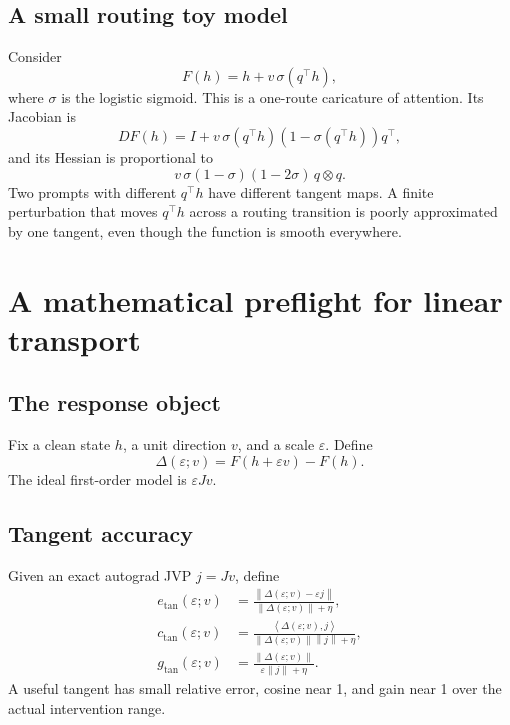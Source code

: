 \documentclass[11pt]{article}
\newcommand{\Norm}[1]{\left\lVert #1 \right\rVert}
\newcommand{\ip}[2]{\left\langle #1,#2 \right\rangle}
\newcommand{\eps}{\varepsilon}
\theoremstyle{definition}
\theoremstyle{remark}
\begin{document}
\subsection{A small routing toy model}
Consider
\begin{equation}
  F(h)=h+v\,\sigma(q^\top h),
  \label{eq:routing_toy}
\end{equation}
where $\sigma$ is the logistic sigmoid. This is a one-route caricature of attention. Its Jacobian is
\begin{equation}
  DF(h)=I+v\,\sigma(q^\top h)(1-\sigma(q^\top h))q^\top,
\end{equation}
and its Hessian is proportional to
\begin{equation}
  v\,\sigma(1-\sigma)(1-2\sigma)\,q\otimes q.
\end{equation}
Two prompts with different $q^\top h$ have different tangent maps. A finite perturbation that moves $q^\top h$ across a routing transition is poorly approximated by one tangent, even though the function is smooth everywhere.

\section{A mathematical preflight for linear transport}

\subsection{The response object}
Fix a clean state $h$, a unit direction $v$, and a scale $\eps$. Define
\begin{equation}
  \Delta(\eps;v)=F(h+\eps v)-F(h).
\end{equation}
The ideal first-order model is $\eps Jv$.

\subsection{Tangent accuracy}
Given an exact autograd JVP $j=Jv$, define
\begin{align}
  e_{\mathrm{tan}}(\eps;v)
  &=\frac{\Norm{\Delta(\eps;v)-\eps j}}
          {\Norm{\Delta(\eps;v)}+\eta},
  \label{eq:tangent_error}\\
  c_{\mathrm{tan}}(\eps;v)
  &=\frac{\ip{\Delta(\eps;v)}{j}}
          {\Norm{\Delta(\eps;v)}\Norm{j}+\eta},
  \label{eq:tangent_cos}\\
  g_{\mathrm{tan}}(\eps;v)
  &=\frac{\Norm{\Delta(\eps;v)}}{\eps\Norm{j}+\eta}.
  \label{eq:tangent_gain}
\end{align}
A useful tangent has small relative error, cosine near 1, and gain near 1 over the actual intervention range.
\end{document}
